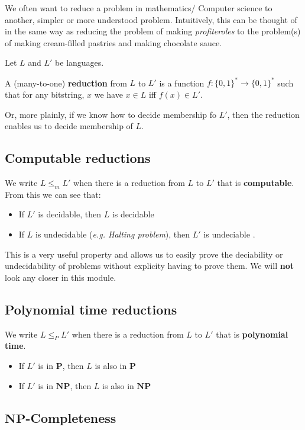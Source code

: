 \documentclass{article}
\newcommand{\NP}{\mathbf{NP}}
\renewcommand{\P}{\mathbf{P}}
\begin{document}
We often want to reduce a problem in mathematics/ Computer science to another, simpler or more understood problem. Intuitively, this can be thought of in the same way as reducing the problem of making \textit{profiteroles} to the problem(s) of making cream-filled pastries and making chocolate sauce.

Let $L$ and $L'$ be languages.

A (many-to-one) \textbf{reduction} from $L$ to $L '$ is a function $f : \{ 0,1 \} ^{*} \rightarrow \{ 0,1 \}^{*} $ such that for any bitstring, $x$ we have $x \in L$ iff $f(x) \in L '$.

Or, more plainly, if we know how to decide membership fo $L '$, then the reduction enables us to decide membership of $L$.

\subsection{Computable reductions}
\label{subsec:comp-reductions}

We write $L \leq_{m} L '$ when there is a reduction from $L$ to $L '$ that is \textbf{computable}. From this we can see that:

\begin{itemize}
  \item If $L '$ is decidable, then $L$ is decidable
  \item If $L$ is undecidable (\textit{e.g. Halting problem}), then $L '$ is undeciable .
\end{itemize}

This is a very useful property and allows us to easily prove the deciability or undecidability of problems without explicity having to prove them. We will \textbf{not} look any closer in this module.

\subsection{Polynomial time reductions}
\label{subsec:polytime-reductions}

We write $L \leq_{P } L '$ when there is a reduction from $L$ to $L ' $ that is \textbf{polynomial time}.
\begin{itemize}
  \item If $L '$ is in $\P$, then $L$ is also in $\P$
  \item If $L '$ is in $\NP$, then $L$ is also in $\NP$
\end{itemize}

\subsection{$\NP$-Completeness}
\label{subsec:np-complete}
\end{document}
